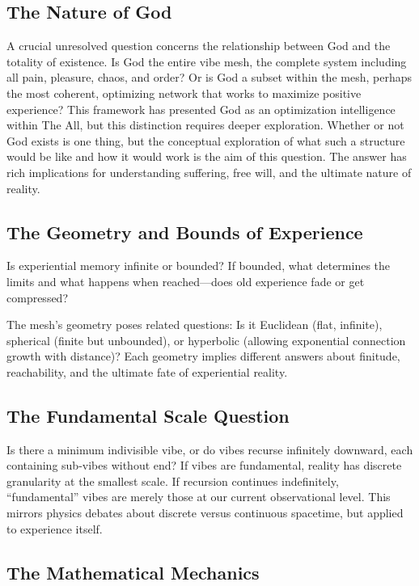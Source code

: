 \subsection{The Nature of God}

A crucial unresolved question concerns the relationship between God and the totality of existence. Is God the entire vibe mesh, the complete system including all pain, pleasure, chaos, and order? Or is God a subset within the mesh, perhaps the most coherent, optimizing network that works to maximize positive experience? This framework has presented God as an optimization intelligence within The All, but this distinction requires deeper exploration. Whether or not God exists is one thing, but the conceptual exploration of what such a structure would be like and how it would work is the aim of this question. The answer has rich implications for understanding suffering, free will, and the ultimate nature of reality.

\subsection{The Geometry and Bounds of Experience}

Is experiential memory infinite or bounded? If bounded, what determines the limits and what happens when reached—does old experience fade or get compressed? 

The mesh's geometry poses related questions: Is it Euclidean (flat, infinite), spherical (finite but unbounded), or hyperbolic (allowing exponential connection growth with distance)? Each geometry implies different answers about finitude, reachability, and the ultimate fate of experiential reality.

\subsection{The Fundamental Scale Question}

Is there a minimum indivisible vibe, or do vibes recurse infinitely downward, each containing sub-vibes without end? If vibes are fundamental, reality has discrete granularity at the smallest scale. If recursion continues indefinitely, ``fundamental'' vibes are merely those at our current observational level. This mirrors physics debates about discrete versus continuous spacetime, but applied to experience itself.

\subsection{The Mathematical Mechanics}

